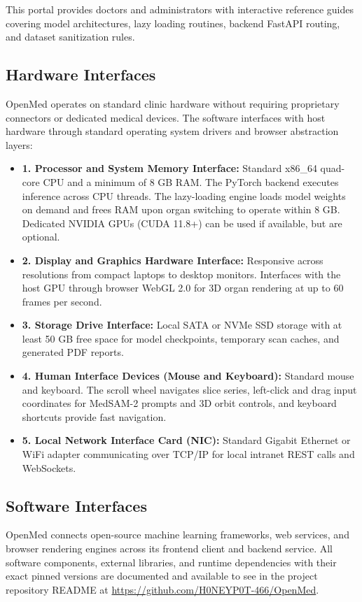 \documentclass[12pt,a4paper]{report}
\begin{document}
This portal provides doctors and administrators with interactive reference guides covering model architectures, lazy loading routines, backend FastAPI routing, and dataset sanitization rules.

\subsection{Hardware Interfaces}
OpenMed operates on standard clinic hardware without requiring proprietary connectors or dedicated medical devices. The software interfaces with host hardware through standard operating system drivers and browser abstraction layers:

\begin{itemize}[leftmargin=1.2em]
    \item \textbf{1. Processor and System Memory Interface:} Standard x86\_64 quad-core CPU and a minimum of 8 GB RAM. The PyTorch backend executes inference across CPU threads. The lazy-loading engine loads model weights on demand and frees RAM upon organ switching to operate within 8 GB. Dedicated NVIDIA GPUs (CUDA 11.8+) can be used if available, but are optional.
    \item \textbf{2. Display and Graphics Hardware Interface:} Responsive across resolutions from compact laptops to desktop monitors. Interfaces with the host GPU through browser WebGL 2.0 for 3D organ rendering at up to 60 frames per second.
    \item \textbf{3. Storage Drive Interface:} Local SATA or NVMe SSD storage with at least 50 GB free space for model checkpoints, temporary scan caches, and generated PDF reports.
    \item \textbf{4. Human Interface Devices (Mouse and Keyboard):} Standard mouse and keyboard. The scroll wheel navigates slice series, left-click and drag input coordinates for MedSAM-2 prompts and 3D orbit controls, and keyboard shortcuts provide fast navigation.
    \item \textbf{5. Local Network Interface Card (NIC):} Standard Gigabit Ethernet or WiFi adapter communicating over TCP/IP for local intranet REST calls and WebSockets.
\end{itemize}

\subsection{Software Interfaces}
OpenMed connects open-source machine learning frameworks, web services, and browser rendering engines across its frontend client and backend service. All software components, external libraries, and runtime dependencies with their exact pinned versions are documented and available to see in the project repository README at \url{https://github.com/H0NEYP0T-466/OpenMed}.
\end{document}
